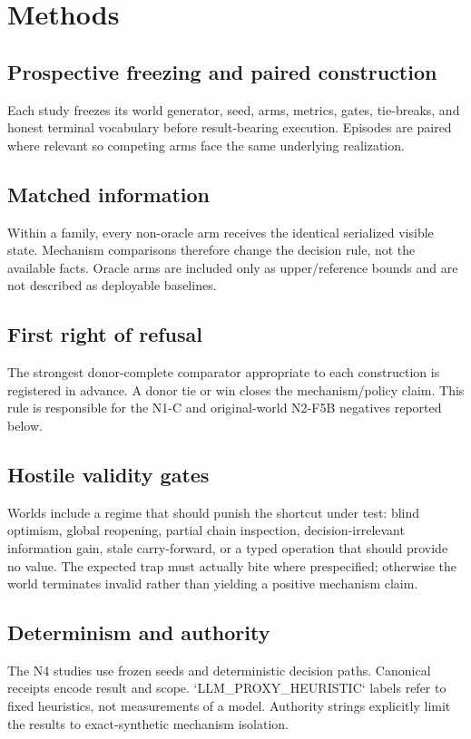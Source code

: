 \section{Methods}

\subsection{Prospective freezing and paired construction}
Each study freezes its world generator, seed, arms, metrics, gates, tie-breaks, and honest terminal vocabulary before result-bearing execution. Episodes are paired where relevant so competing arms face the same underlying realization.

\subsection{Matched information}
Within a family, every non-oracle arm receives the identical serialized visible state. Mechanism comparisons therefore change the decision rule, not the available facts. Oracle arms are included only as upper/reference bounds and are not described as deployable baselines.

\subsection{First right of refusal}
The strongest donor-complete comparator appropriate to each construction is registered in advance. A donor tie or win closes the mechanism/policy claim. This rule is responsible for the N1-C and original-world N2-F5B negatives reported below.

\subsection{Hostile validity gates}
Worlds include a regime that should punish the shortcut under test: blind optimism, global reopening, partial chain inspection, decision-irrelevant information gain, stale carry-forward, or a typed operation that should provide no value. The expected trap must actually bite where prespecified; otherwise the world terminates invalid rather than yielding a positive mechanism claim.

\subsection{Determinism and authority}
The N4 studies use frozen seeds and deterministic decision paths. Canonical receipts encode result and scope. `LLM_PROXY_HEURISTIC` labels refer to fixed heuristics, not measurements of a model. Authority strings explicitly limit the results to exact-synthetic mechanism isolation.